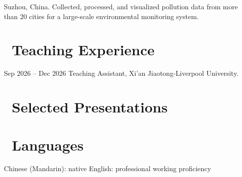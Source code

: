 \documentclass{resume}
\begin{document}
Suzhou, China. Collected, processed, and visualized pollution data from more than 20 cities
for a large-scale environmental monitoring system.

\section{\faGraduationCap\ Teaching Experience}

{Sep 2026 -- Dec 2026}
Teaching Assistant, Xi'an Jiaotong-Liverpool University.

\section{\faMicrophone\ Selected Presentations}


\section{\faLanguage\ Languages}

Chinese (Mandarin): native \quad
\textperiodcentered\quad English: professional working proficiency
\end{document}
